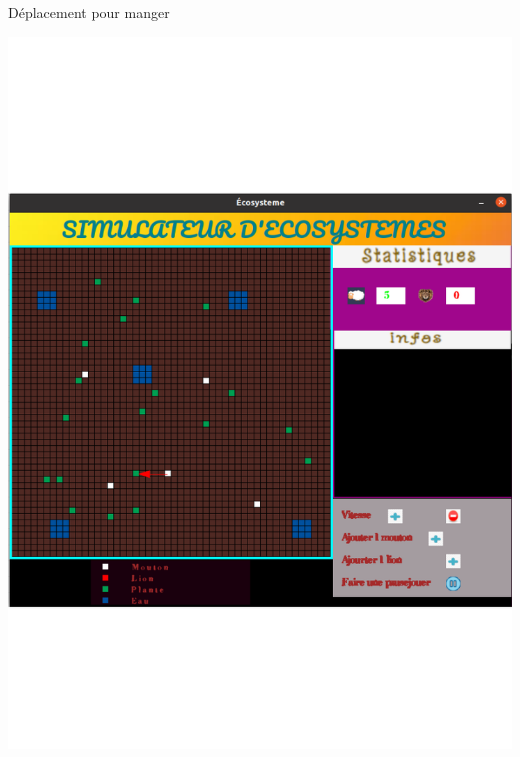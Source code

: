 \documentclass{beamer}
\begin{document}
\begin{frame}{Déplacement pour manger}
    \begin{center}
            \includegraphics[keepaspectratio, scale=0.22]{images/depm.png}
    \end{center}
\end{frame}
\end{document}
